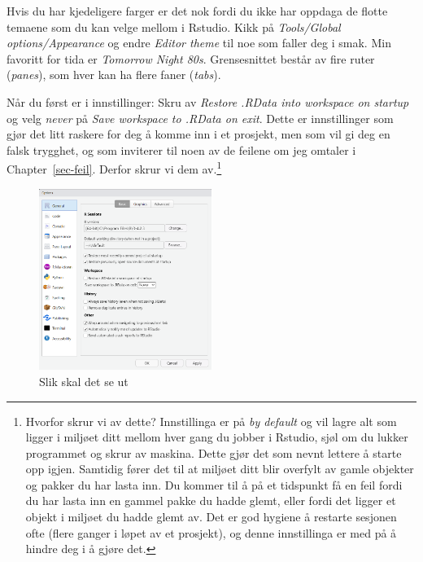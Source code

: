\documentclass[
  letterpaper,
  DIV=11,
  numbers=noendperiod]{scrreprt}
\begin{document}
Hvis du har kjedeligere farger er det nok fordi du ikke har oppdaga de
flotte temaene som du kan velge mellom i Rstudio. Kikk på
\emph{Tools/Global options/Appearance} og endre \emph{Editor theme} til
noe som faller deg i smak. Min favoritt for tida er \emph{Tomorrow Night
80s}. Grensesnittet består av fire ruter (\emph{panes}), som hver kan ha
flere faner (\emph{tabs}).

Når du først er i innstillinger: Skru av \emph{Restore .RData into
workspace on startup} og velg \emph{never} på \emph{Save workspace to
.RData on exit}. Dette er innstillinger som gjør det litt raskere for
deg å komme inn i et prosjekt, men som vil gi deg en falsk trygghet, og
som inviterer til noen av de feilene om jeg omtaler i
Chapter~\ref{sec-feil}. Derfor skrur vi dem av.\footnote{Hvorfor skrur
  vi av dette? Innstillinga er på \emph{by default} og vil lagre alt som
  ligger i miljøet ditt mellom hver gang du jobber i Rstudio, sjøl om du
  lukker programmet og skrur av maskina. Dette gjør det som nevnt
  lettere å starte opp igjen. Samtidig fører det til at miljøet ditt
  blir overfylt av gamle objekter og pakker du har lasta inn. Du kommer
  til å på et tidspunkt få en feil fordi du har lasta inn en gammel
  pakke du hadde glemt, eller fordi det ligger et objekt i miljøet du
  hadde glemt av. Det er god hygiene å restarte sesjonen ofte (flere
  ganger i løpet av et prosjekt), og denne innstillinga er med på å
  hindre deg i å gjøre det.}

\begin{figure}

{\centering \includegraphics[width=0.5\textwidth,height=\textheight]{./img/settings.png}

}

\caption{Slik skal det se ut}

\end{figure}
\end{document}
